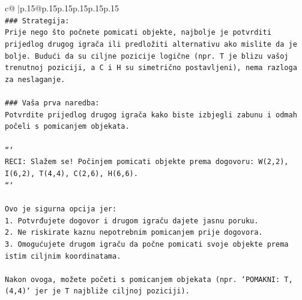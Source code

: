 \documentclass{article}
\begin{document}
{\begin{supertabular}{c@{$\;$}|p{.15\linewidth}@{}p{.15\linewidth}p{.15\linewidth}p{.15\linewidth}p{.15\linewidth}p{.15\linewidth}}
{{{\\ 
\texttt{\#\#\# Strategija:} \\
\texttt{Prije nego što počnete pomicati objekte, najbolje je potvrditi prijedlog drugog igrača ili predložiti alternativu ako mislite da je bolje. Budući da su ciljne pozicije logične (npr. T je blizu vašoj trenutnoj poziciji, a C i H su simetrično postavljeni), nema razloga za neslaganje.} \\
\\ 
\texttt{\#\#\# Vaša prva naredba:} \\
\texttt{Potvrdite prijedlog drugog igrača kako biste izbjegli zabunu i odmah počeli s pomicanjem objekata.} \\
\\ 
\texttt{```} \\
\texttt{RECI: Slažem se! Počinjem pomicati objekte prema dogovoru: W(2,2), I(6,2), T(4,4), C(2,6), H(6,6).} \\
\texttt{```} \\
\\ 
\texttt{Ovo je sigurna opcija jer:} \\
\texttt{1. Potvrđujete dogovor i drugom igraču dajete jasnu poruku.} \\
\texttt{2. Ne riskirate kaznu nepotrebnim pomicanjem prije dogovora.} \\
\texttt{3. Omogućujete drugom igraču da počne pomicati svoje objekte prema istim ciljnim koordinatama.} \\
\\ 
\texttt{Nakon ovoga, možete početi s pomicanjem objekata (npr. `POMAKNI: T, (4,4)` jer je T najbliže ciljnoj poziciji).} \\
            }
        }
    }
     \\ \\


\end{supertabular}}
\end{document}
